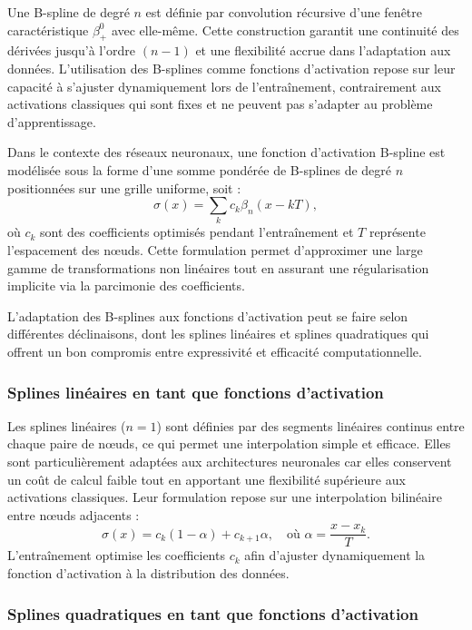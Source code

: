\documentclass[a4paper, 12pt]{report} %
\begin{document}
Une B-spline de degré $n$ est définie par convolution récursive d'une fenêtre caractéristique $\beta_{+}^{0}$ avec elle-même. Cette construction garantit une continuité des dérivées jusqu'à l'ordre $(n-1)$ et une flexibilité accrue dans l'adaptation aux données. L'utilisation des B-splines comme fonctions d'activation repose sur leur capacité à s'ajuster dynamiquement lors de l'entraînement, contrairement aux activations classiques qui sont fixes et ne peuvent pas s'adapter au problème d'apprentissage.

Dans le contexte des réseaux neuronaux, une fonction d'activation B-spline est modélisée sous la forme d'une somme pondérée de B-splines de degré $n$ positionnées sur une grille uniforme, soit :
\begin{equation}
    \sigma(x) = \sum_{k} c_k \beta_n(x - kT),
\end{equation}
où $c_k$ sont des coefficients optimisés pendant l'entraînement et $T$ représente l'espacement des nœuds. Cette formulation permet d'approximer une large gamme de transformations non linéaires tout en assurant une régularisation implicite via la parcimonie des coefficients.

L'adaptation des B-splines aux fonctions d'activation peut se faire selon différentes déclinaisons, dont les splines linéaires et splines quadratiques qui offrent un bon compromis entre expressivité et efficacité computationnelle.

\subsubsection{Splines linéaires en tant que fonctions d'activation}

Les splines linéaires ($n=1$) sont définies par des segments linéaires continus entre chaque paire de nœuds, ce qui permet une interpolation simple et efficace. Elles sont particulièrement adaptées aux architectures neuronales car elles conservent un coût de calcul faible tout en apportant une flexibilité supérieure aux activations classiques. Leur formulation repose sur une interpolation bilinéaire entre nœuds adjacents :
\begin{equation}
    \sigma(x) = c_k (1 - \alpha) + c_{k+1} \alpha, \quad \text{où } \alpha = \frac{x - x_k}{T}.
\end{equation}
L'entraînement optimise les coefficients $c_k$ afin d'ajuster dynamiquement la fonction d'activation à la distribution des données.

\subsubsection{Splines quadratiques en tant que fonctions d'activation}
\end{document}
